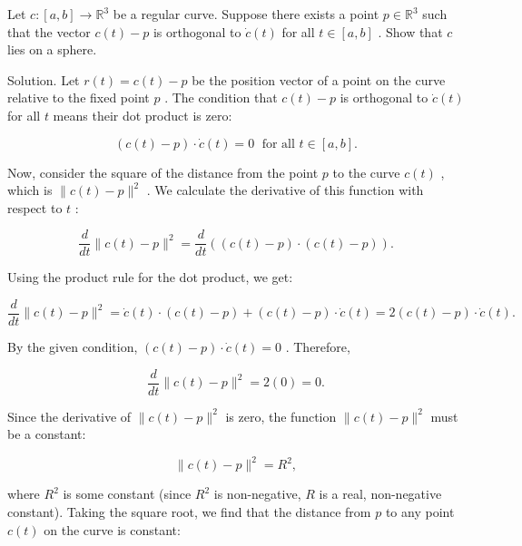 \documentclass[10pt]{article}
\begin{document}
\begin{problem}[title=PROBLEM 4 (3 POINTS)]
Let \(c : \left\lbrack  {a,b}\right\rbrack   \rightarrow  {\mathbb{R}}^{3}\) be a regular curve. Suppose there exists a point \(p \in  {\mathbb{R}}^{3}\) such that the vector \(c\left( t\right)  - p\) is orthogonal to \(\dot{c}\left( t\right)\) for all \(t \in  \left\lbrack  {a,b}\right\rbrack\) . Show that \(c\) lies on a sphere.
\end{problem}

Solution. Let \(r\left( t\right)  = c\left( t\right)  - p\) be the position vector of a point on the curve relative to the fixed point \(p\) . The condition that \(c\left( t\right)  - p\) is orthogonal to \(\dot{c}\left( t\right)\) for all \(t\) means their dot product is zero:

\[
\left( {c\left( t\right)  - p}\right)  \cdot  \dot{c}\left( t\right)  = 0\;\text{ for all }t \in  \left\lbrack  {a,b}\right\rbrack  .
\]

Now, consider the square of the distance from the point \(p\) to the curve \(c\left( t\right)\) , which is \(\parallel c\left( t\right)  - p{\parallel }^{2}\) . We calculate the derivative of this function with respect to \(t\) :

\[
\frac{d}{dt}\parallel c\left( t\right)  - p{\parallel }^{2} = \frac{d}{dt}\left( {\left( {c\left( t\right)  - p}\right)  \cdot  \left( {c\left( t\right)  - p}\right) }\right) .
\]

Using the product rule for the dot product, we get:

\[
\frac{d}{dt}\parallel c\left( t\right)  - p{\parallel }^{2} = \dot{c}\left( t\right)  \cdot  \left( {c\left( t\right)  - p}\right)  + \left( {c\left( t\right)  - p}\right)  \cdot  \dot{c}\left( t\right)  = 2\left( {c\left( t\right)  - p}\right)  \cdot  \dot{c}\left( t\right) .
\]

By the given condition, \(\left( {c\left( t\right)  - p}\right)  \cdot  \dot{c}\left( t\right)  = 0\) . Therefore,

\[
\frac{d}{dt}\parallel c\left( t\right)  - p{\parallel }^{2} = 2\left( 0\right)  = 0.
\]

Since the derivative of \(\parallel c\left( t\right)  - p{\parallel }^{2}\) is zero, the function \(\parallel c\left( t\right)  - p{\parallel }^{2}\) must be a constant:

\[
\parallel c\left( t\right)  - p{\parallel }^{2} = {R}^{2},
\]

where \({R}^{2}\) is some constant (since \({R}^{2}\) is non-negative, \(R\) is a real, non-negative constant). Taking the square root, we find that the distance from \(p\) to any point \(c\left( t\right)\) on the curve is constant:
\end{document}
